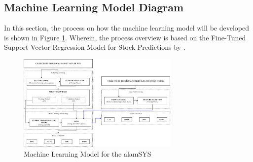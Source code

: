 \subsection{Machine Learning Model Diagram}
\label{subsec:ml_diagram}
In this section, the process on how the machine learning model 
will be developed is shown in Figure \ref{fig:ml_model}. 
Wherein, the process overview is based on the Fine-Tuned Support 
Vector Regression Model for Stock Predictions by 
.
\begin{figure}[ht]
    \centering
    \includegraphics[width=0.7\textwidth]{./assets/Chapter_3/Machine Learning Model.png}
    \caption{Machine Learning Model for the alamSYS}
    \label{fig:ml_model}
\end{figure}
\FloatBarrier
